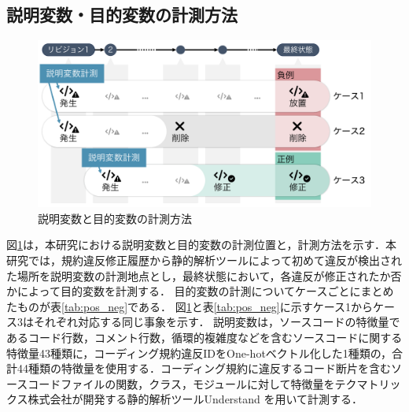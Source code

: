 \documentclass[submit,noauthor,ses,dvipdfmx]{ipsj}
\begin{document}
\subsection{説明変数・目的変数の計測方法}


\begin{figure}[t]
	\centering
	\includegraphics[width=1.0\linewidth]{Kameoka_fig/kameoka_fig2.pdf}
	\caption{説明変数と目的変数の計測方法}
	\label{fig:mokutekihensu}
\end{figure}

図\ref{fig:mokutekihensu}は，本研究における説明変数と目的変数の計測位置と，計測方法を示す．本研究では，規約違反修正履歴から静的解析ツールによって初めて違反が検出された場所を説明変数の計測地点とし，最終状態において，各違反が修正されたか否かによって目的変数を計測する．
目的変数の計測についてケースごとにまとめたものが表\ref{tab:pos_neg}である．
図\ref{fig:mokutekihensu}と表\ref{tab:pos_neg}に示すケース1からケース3はそれぞれ対応する同じ事象を示す．
説明変数は，ソースコードの特徴量であるコード行数，コメント行数，循環的複雑度などを含むソースコードに関する特徴量43種類に，コーディング規約違反IDをOne-hotベクトル化した1種類の，合計44種類の特徴量を使用する．コーディング規約に違反するコード断片を含むソースコードファイルの関数，クラス，モジュールに対して特徴量をテクマトリックス株式会社が開発する静的解析ツールUnderstand
を用いて計測する．




\begin{table}[t]
    \centering
    \caption{正例と負例の分類}
    \label{tab:pos_neg}
\end{table}
\end{document}
